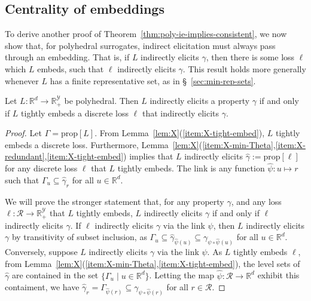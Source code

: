 \documentclass[twoside,11pt]{article}
\newcommand{\reals}{\mathbb{R}}
\newcommand{\prop}[1]{\mathrm{prop}[#1]}
\newcommand{\R}{\mathcal{R}}
\newcommand{\Y}{\mathcal{Y}}
\begin{document}
\subsection{Centrality of embeddings}

To derive another proof of Theorem~\ref{thm:poly-ie-implies-consistent}, we now show that, for polyhedral surrogates, indirect elicitation must always pass through an embedding.
That is, if $L$ indirectly elicits $\gamma$, then there is some loss $\ell$ which $L$ embeds, such that $\ell$ indirectly elicits $\gamma$.
This result holds more generally whenever $L$ has a finite representative set, as in \S~\ref{sec:min-rep-sets}.
\begin{lemma}\label{lem:ie-iff-embeds-refinement}
  Let $L:\reals^d\to\reals^\Y_+$ be polyhedral.
  Then $L$ indirectly elicits a property $\gamma$ if and only if $L$ tightly embeds a discrete loss $\ell$ that indirectly elicits $\gamma$.
\end{lemma}
\begin{proof}
  Let $\Gamma = \prop L$.
From Lemma~\ref{lem:X}(\ref{item:X-tight-embed}), $L$ tightly embeds a discrete loss.
  Furthermore, Lemma~\ref{lem:X}(\ref{item:X-min-Theta},\ref{item:X-redundant},\ref{item:X-tight-embed}) implies that $L$ indirectly elicits $\hat\gamma := \prop \ell$ for any discrete loss $\ell$ that $L$ tightly embeds.
  The link is any function $\hat\psi: u \mapsto r$ such that $\Gamma_u \subseteq \hat\gamma_r$ for all $u \in \reals^d$.

  We will prove the stronger statement that, for any property $\gamma$, and any loss $\ell:\R\to\reals^\Y_+$ that $L$ tightly embeds, $L$ indirectly elicits $\gamma$ if and only if $\ell$ indirectly elicits $\gamma$.
  If $\ell$ indirectly elicits $\gamma$ via the link $\psi$, then $L$ indirectly elicits $\gamma$ by transitivity of subset inclusion, as $\Gamma_u \subseteq \hat\gamma_{\hat\psi(u)} \subseteq \gamma_{\psi \circ \hat\psi(u)}$ for all $u \in \reals^d$.
  Conversely, suppose $L$ indirectly elicits $\gamma$ via the link $\psi$.
  As $L$ tightly embeds $\ell$, from Lemma~\ref{lem:X}(\ref{item:X-min-Theta},\ref{item:X-tight-embed}), the level sets of $\hat \gamma$ are contained in the set $\{\Gamma_u \mid u\in\reals^d\}$.
  Letting the map $\hat\psi:\R\to\reals^d$ exhibit this contaiment, we have $\hat\gamma_r = \Gamma_{\hat\psi(r)} \subseteq \gamma_{\psi \circ \hat\psi (r)}$ for all $r\in\R$.
\end{proof}
\end{document}
